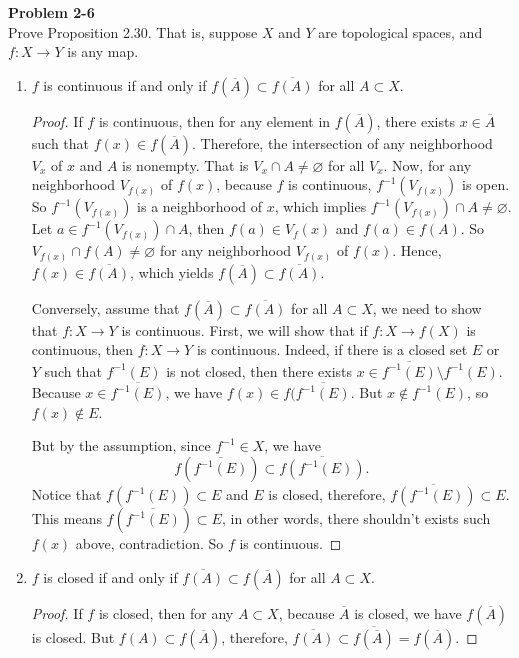 \documentclass[12pt, a4paper]{article}
\theoremstyle{plain}
\newenvironment{problem}[2][Problem]
    { \begin{mdframed}[backgroundcolor=gray!20] \textbf{#1 #2} \\}
    {  \end{mdframed}}
\begin{document}
\begin{problem}{2-6}
Prove Proposition 2.30. That is, suppose $X$ and $Y$ are topological spaces, and $f:X\rightarrow Y$ is any map.
\begin{enumerate}[label=(\alph*)]
\item $f$ is continuous if and only if $f(\overline{A})\subset \overline{f(A)}$ for all $A\subset X$.
	\begin{proof}
	If $f$ is continuous, then for any element in $f(\overline{A})$, there exists $x\in \overline{A}$ such that $f(x)\in f(\overline{A})$. Therefore, the intersection of any neighborhood $V_x$ of $x$ and $A$ is nonempty. That is $V_x\cap A\neq\varnothing$ for all $V_x$. Now, for any neighborhood $V_{f(x)}$ of $f(x)$, because $f$ is continuous, $f^{-1}(V_{f(x)})$ is open. So $f^{-1}(V_{f(x)})$ is a neighborhood of $x$, which implies $f^{-1}(V_{f(x)})\cap A\neq \varnothing$. Let $a\in f^{-1}(V_{f(x)})\cap A$, then $f(a)\in V_f(x)$ and $f(a)\in f(A)$. So $V_{f(x)}\cap f(A)\neq \varnothing$ for any neighborhood $V_{f(x)}$ of $f(x)$. Hence, $f(x)\in\overline{f(A)}$, which yields $f(\overline{A})\subset \overline{f(A)}$.
	
	Conversely, assume that $f(\overline{A})\subset \overline{f(A)}$ for all $A\subset X$, we need to show that $f:X\rightarrow Y$ is continuous. First, we will show that if $f:X\rightarrow f(X)$ is continuous, then $f:X\rightarrow Y$ is continuous. Indeed, if there is a closed set $E$ or $Y$ such that $f^{-1}(E)$ is not closed, then there exists $x\in \overline{f^{-1}(E)}\setminus f^{-1}(E)$. Because $x\in \overline{f^{-1}(E)}$, we have $f(x)\in f(\overline{f^{-1}(E)}$. But $x\notin f^{-1}(E)$, so $f(x)\notin E$.
	
	But by the assumption, since $f^{-1}\in X$, we have
	\[
	f(\overline{f^{-1}(E)})\subset \overline{f(f^{-1}(E))}.
	\]
	Notice that $f(f^{-1}(E))\subset E$ and $E$ is closed, therefore, $\overline{f(f^{-1}(E))}\subset E$. This means $f(\overline{f^{-1}(E)})\subset E$, in other words, there shouldn't exists such $f(x)$ above, contradiction. So $f$ is continuous.
	\end{proof}
\item $f$ is closed if and only if $\overline{f(A)}\subset f(\overline{A})$ for all $A\subset X$.
	\begin{proof}
	If $f$ is closed, then for any $A\subset X$, because $\overline{A}$ is closed, we have $f(\overline{A})$ is closed. But $f(A)\subset f(\overline{A})$, therefore, $\overline{f(A)}\subset \overline{f(\overline{A})}=f(\overline{A})$.
	

\end{proof}
\end{enumerate}
\end{problem}
\end{document}
